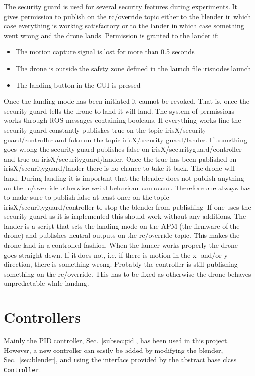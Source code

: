 \documentclass[titlepage,11pt,a4paper]{article}
\begin{document}
The security guard is used for several security features during
experiments. It gives permission to publish on the rc/override topic
either to the blender in which case everything is working satisfactory
or to the lander in which case something went wrong and the drone
lands. Permission is granted to the lander if:
\begin{itemize}
  \item The motion capture signal is lost for more than 0.5 seconds
  \item The drone is outside the safety zone defined in the launch
    file iris\textunderscore nodes.launch
  \item The landing button in the GUI is pressed
\end{itemize}
Once the landing mode has been initiated it cannot be revoked. That
is, once the security guard tells the drone to land it will land.  The
system of permissions works through ROS messages containing
booleans. If everything works fine the security guard constantly
publishes true on the topic irisX/security\textunderscore
guard/controller and false on the topic irisX/security\textunderscore
guard/lander. If something goes wrong the security guard publishes
false on irisX/security\textunderscore guard/controller and true on
irisX/security\textunderscore guard/lander. Once the true has been
published on irisX/security\textunderscore guard/lander there is no
chance to take it back. The drone will land. During landing it is
important that the blender does not publish anything on the
rc/override otherwise weird behaviour can occur. Therefore one always
has to make sure to publish false at least once on the topic
irisX/security\textunderscore guard/controller to stop the blender
from publishing. If one uses the security guard as it is implemented
this should work without any additions.  The lander is a script that
sets the landing mode on the APM (the firmware of the drone) and
publishes neutral outputs on the rc/override topic. This makes the
drone land in a controlled fashion. When the lander works properly the
drone goes straight down. If it does not, i.e. if there is motion in
the x- and/or y-direction, there is something wrong. Probably the
controller is still publishing something on the rc/override. This has
to be fixed as otherwise the drone behaves unpredictable while
landing.

\section{Controllers}
Mainly the PID controller, Sec.~\ref{subsec:pid}, has been used in
this project. However, a new controller can easily be added by
modifying the blender, Sec.~\ref{sec:blender}, and using the interface
provided by the abstract base class \texttt{Controller}.
\end{document}
